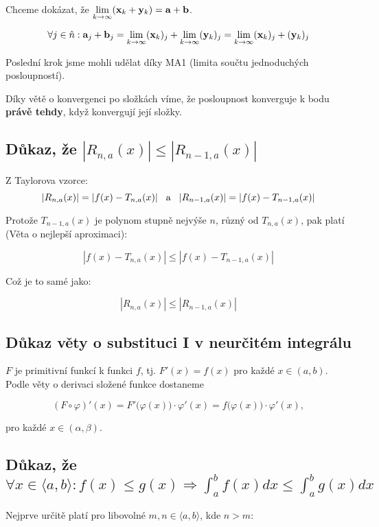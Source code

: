 \noindent Chceme dokázat, že $\lim\limits_{k\to\infty} (\mathbf{x}_k + \mathbf{y}_k) = \mathbf{a} + \mathbf{b}$.

\[ \forall j \in \hat{n}: \mathbf{a}_j + \mathbf{b}_j = \lim\limits_{k\to\infty} (\mathbf{x}_k)_j + \lim\limits_{k\to\infty} (\mathbf{y}_k)_j = \lim\limits_{k\to\infty} (\mathbf{x}_k)_j + (\mathbf{y}_k)_j\]

\noindent Poslední krok jsme mohli udělat díky MA1 (limita součtu jednoduchých posloupností).

\noindent Díky větě o konvergenci po složkách víme, že posloupnost konverguje k bodu \textbf{právě tehdy}, když konvergují její složky.

\subsection*{Důkaz, že $|R_{n,a}(x)| \leq |R_{n-1,a}(x)|$}

Z Taylorova vzorce: \[ |R_{n,a}(x)| = |f(x) - T_{n, a}(x)| \hspace{3mm}\text{a}\hspace{3mm} |R_{n-1,a}(x)| = |f(x) - T_{n - 1, a}(x)| \]

\noindent Protože $T_{n - 1, a}(x)$ je polynom stupně nejvýše $n$, různý od $T_{n, a}(x)$, pak platí (Věta o nejlepší aproximaci):

\[ |f(x) - T_{n, a}(x)| \leq |f(x) - T_{n - 1, a}(x)| \]

\noindent Což je to samé jako:

\[ |R_{n,a}(x)| \leq |R_{n-1,a}(x)| \]

\subsection*{Důkaz věty o substituci I v neurčitém integrálu}

$F$ je primitivní funkcí k funkci $f$, tj. $F'(x) = f(x)$ pro každé $x\in(a,b)$. Podle věty o derivaci složené funkce dostaneme

\[ (F\circ \varphi)'(x) = F'\big( \varphi(x)  \big) \cdot \varphi'(x) = f\big( \varphi(x) \big) \cdot \varphi'(x), \]

\noindent pro každé $x\in(\alpha,\beta)$.

\subsection*{Důkaz, že $\forall x \in \langle a, b\rangle:  f(x) \leq g(x) \Rightarrow \int_a^b f(x)dx \leq \int_a^b g(x)dx$}

Nejprve určitě platí pro libovolné $m, n \in \langle a, b \rangle$, kde $n >
    m$:

